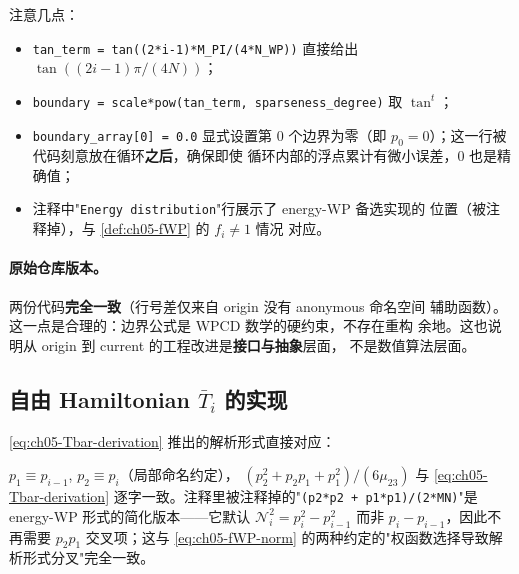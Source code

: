 注意几点：
\begin{itemize}
  \item \texttt{tan\_term = tan((2*i-1)*M\_PI/(4*N\_WP))} 直接给出
        \(\tan((2i-1)\pi/(4N))\)；
  \item \texttt{boundary = scale*pow(tan\_term, sparseness\_degree)} 取
        \(\tan^t\)；
  \item \texttt{boundary\_array[0] = 0.0} 显式设置第 0 个边界为零（即
        \(p_0 = 0\)）；这一行被代码刻意放在循环\textbf{之后}，确保即使
        循环内部的浮点累计有微小误差，0 也是精确值；
  \item 注释中"\texttt{Energy distribution}"行展示了 energy-WP 备选实现的
        位置（被注释掉），与 \cref{def:ch05-fWP} 的 \(f_i \neq 1\) 情况
        对应。
\end{itemize}

\paragraph{原始仓库版本。}


两份代码\textbf{完全一致}（行号差仅来自 origin 没有 anonymous 命名空间
辅助函数）。这一点是合理的：边界公式是 WPCD 数学的硬约束，不存在重构
余地。这也说明从 origin 到 current 的工程改进是\textbf{接口与抽象}层面，
不是数值算法层面。

\subsection{自由 Hamiltonian \(\bar{T}_i\) 的实现}
\label{subsec:ch05-code-H0}

\cref{eq:ch05-Tbar-derivation} 推出的解析形式直接对应：


\(p_1 \equiv p_{i-1}\), \(p_2 \equiv p_i\)（局部命名约定），
\((p_2^2 + p_2 p_1 + p_1^2) / (6\mu_{23})\) 与 \cref{eq:ch05-Tbar-derivation}
逐字一致。注释里被注释掉的"\texttt{(p2*p2 + p1*p1)/(2*MN)}"是 energy-WP
形式的简化版本——它默认 \(\mathcal{N}_i^2 = p_i^2 - p_{i-1}^2\) 而非
\(p_i - p_{i-1}\)，因此不再需要 \(p_2 p_1\) 交叉项；这与
\cref{eq:ch05-fWP-norm} 的两种约定的"权函数选择导致解析形式分叉"完全一致。

